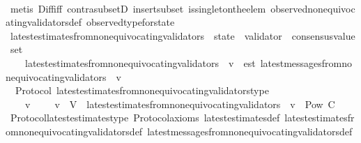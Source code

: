 \begin{isabellebody}
\ \ \ \ \isamarkupfalse%
\ {\isacharparenleft}metis\ Diff{\isacharunderscore}iff\ contra{\isacharunderscore}subsetD\ insert{\isacharunderscore}subset\ is{\isacharunderscore}singleton{\isacharunderscore}the{\isacharunderscore}elem\ observed{\isacharunderscore}non{\isacharunderscore}equivocating{\isacharunderscore}validators{\isacharunderscore}def\ observed{\isacharunderscore}type{\isacharunderscore}for{\isacharunderscore}state{\isacharparenright}%
\endisatagproof
{\isafoldproof}%
%
\isadelimproof
\isanewline
%
\endisadelimproof
\ \ \isanewline
\isanewline
\isanewline
\isanewline
\isanewline
{}\isamarkupfalse%
\ latest{\isacharunderscore}estimates{\isacharunderscore}from{\isacharunderscore}non{\isacharunderscore}equivocating{\isacharunderscore}validators\ {\isacharcolon}{\isacharcolon}\ {\isachardoublequoteopen}state\ {\isasymRightarrow}\ validator\ {\isasymRightarrow}\ consensus{\isacharunderscore}value\ set{\isachardoublequoteclose}\isanewline
\ \ \isanewline
\ \ \ \ \isanewline
\ \ \ \ {\isachardoublequoteopen}latest{\isacharunderscore}estimates{\isacharunderscore}from{\isacharunderscore}non{\isacharunderscore}equivocating{\isacharunderscore}validators\ {\isasymsigma}\ v\ {\isacharequal}\ est\ {\isacharbackquote}latest{\isacharunderscore}messages{\isacharunderscore}from{\isacharunderscore}non{\isacharunderscore}equivocating{\isacharunderscore}validators\ {\isasymsigma}\ v{\isachardoublequoteclose}\isanewline
\isanewline
{}\isamarkupfalse%
\ {\isacharparenleft}\ Protocol{\isacharparenright}\ latest{\isacharunderscore}estimates{\isacharunderscore}from{\isacharunderscore}non{\isacharunderscore}equivocating{\isacharunderscore}validators{\isacharunderscore}type\ {\isacharcolon}\isanewline
\ \ {\isachardoublequoteopen}{\isasymforall}\ {\isasymsigma}\ v{\isachardot}\ {\isasymsigma}\ {\isasymin}\ {\isasymSigma}\ {\isasymand}\ v\ {\isasymin}\ V\ {\isasymlongrightarrow}\ latest{\isacharunderscore}estimates{\isacharunderscore}from{\isacharunderscore}non{\isacharunderscore}equivocating{\isacharunderscore}validators\ {\isasymsigma}\ v\ {\isasymin}\ Pow\ C{\isachardoublequoteclose}\isanewline
%
\isadelimproof
\ \ %
\endisadelimproof
%
\isatagproof
{}\isamarkupfalse%
\ Protocol{\isachardot}latest{\isacharunderscore}estimates{\isacharunderscore}type\ Protocol{\isacharunderscore}axioms\ latest{\isacharunderscore}estimates{\isacharunderscore}def\ latest{\isacharunderscore}estimates{\isacharunderscore}from{\isacharunderscore}non{\isacharunderscore}equivocating{\isacharunderscore}validators{\isacharunderscore}def\ latest{\isacharunderscore}messages{\isacharunderscore}from{\isacharunderscore}non{\isacharunderscore}equivocating{\isacharunderscore}validators{\isacharunderscore}def\ \isanewline

\end{isabellebody}
